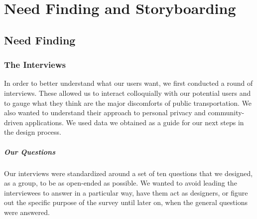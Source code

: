 \documentclass[a4paper, 11pt]{report}
\begin{document}
\chapter{Need Finding and Storyboarding}\label{chap:need-finding-and-storyboarding}

\section{Need Finding}\label{sec:need-finding}

\subsection{The Interviews}\label{ssec:the-interviews}

In order to better understand what our users want, we first conducted a round of interviews.
These allowed us to interact colloquially with our potential users and to gauge what they think
are the major discomforts of public transportation. We also wanted to understand their approach
to personal privacy and community-driven applications. We used data we obtained as a guide for our
next steps in the design process.

\paragraph{Our Questions}

Our interviews were standardized around a set of ten questions that we designed, as a group,
to be as open-ended as possible. We wanted to avoid leading the interviewees to answer in a
particular way, have them act as designers, or figure out the specific purpose of the
survey until later on, when the general questions were answered.\\[2pt]
\end{document}
